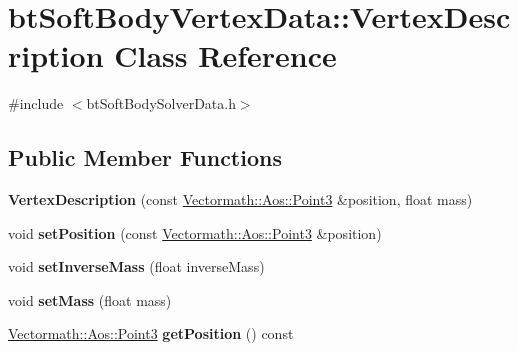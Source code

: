 \hypertarget{classbt_soft_body_vertex_data_1_1_vertex_description}{\section{bt\+Soft\+Body\+Vertex\+Data\+:\+:Vertex\+Description Class Reference}
\label{classbt_soft_body_vertex_data_1_1_vertex_description}
}


{\ttfamily \#include $<$bt\+Soft\+Body\+Solver\+Data.\+h$>$}

\subsection*{Public Member Functions}
\begin{DoxyCompactItemize}
\item 
\hypertarget{classbt_soft_body_vertex_data_1_1_vertex_description_aedff609f8656322a5b0dbe7019cce12b}{{\bfseries Vertex\+Description} (const \hyperlink{class_vectormath_1_1_aos_1_1_point3}{Vectormath\+::\+Aos\+::\+Point3} \&position, float mass)}\label{classbt_soft_body_vertex_data_1_1_vertex_description_aedff609f8656322a5b0dbe7019cce12b}

\item 
\hypertarget{classbt_soft_body_vertex_data_1_1_vertex_description_a56f64e174dcd0a4118a776affabedf4a}{void {\bfseries set\+Position} (const \hyperlink{class_vectormath_1_1_aos_1_1_point3}{Vectormath\+::\+Aos\+::\+Point3} \&position)}\label{classbt_soft_body_vertex_data_1_1_vertex_description_a56f64e174dcd0a4118a776affabedf4a}

\item 
\hypertarget{classbt_soft_body_vertex_data_1_1_vertex_description_af1dd19f6c64c78883f8558c57acfdfca}{void {\bfseries set\+Inverse\+Mass} (float inverse\+Mass)}\label{classbt_soft_body_vertex_data_1_1_vertex_description_af1dd19f6c64c78883f8558c57acfdfca}

\item 
\hypertarget{classbt_soft_body_vertex_data_1_1_vertex_description_ace4e313f42951933eb855027f965e122}{void {\bfseries set\+Mass} (float mass)}\label{classbt_soft_body_vertex_data_1_1_vertex_description_ace4e313f42951933eb855027f965e122}

\item 
\hypertarget{classbt_soft_body_vertex_data_1_1_vertex_description_a1bedfef5e63d0b10e7e5b4debeabbf87}{\hyperlink{class_vectormath_1_1_aos_1_1_point3}{Vectormath\+::\+Aos\+::\+Point3} {\bfseries get\+Position} () const }\label{classbt_soft_body_vertex_data_1_1_vertex_description_a1bedfef5e63d0b10e7e5b4debeabbf87}


\end{DoxyCompactItemize}
